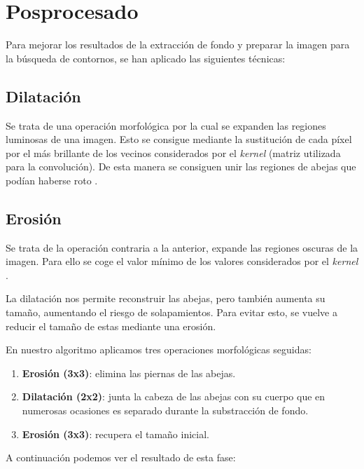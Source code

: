 \section{Posprocesado}\label{posprocesado}

Para mejorar los resultados de la extracción de fondo y preparar la
imagen para la búsqueda de contornos, se han aplicado las siguientes
técnicas:

\subsection{Dilatación}\label{dilatacion}

Se trata de una operación morfológica por la cual se expanden las
regiones luminosas de una imagen. Esto se consigue mediante la
sustitución de cada píxel por el más brillante de los vecinos
considerados por el \emph{kernel} (matriz utilizada para la
convolución). De esta manera se consiguen unir las regiones de abejas
que podían haberse roto \citep{book:mastering_opencv}.

\subsection{Erosión}\label{erosion}

Se trata de la operación contraria a la anterior, expande las regiones
oscuras de la imagen. Para ello se coge el valor mínimo de los valores
considerados por el \emph{kernel} \citep{book:mastering_opencv}.

La dilatación nos permite reconstruir las abejas, pero también aumenta
su tamaño, aumentando el riesgo de solapamientos. Para evitar esto, se
vuelve a reducir el tamaño de estas mediante una erosión.

En nuestro algoritmo aplicamos tres operaciones morfológicas seguidas:

\begin{enumerate}
\def\labelenumi{\arabic{enumi}.}
\tightlist
\item
  \textbf{Erosión (3x3)}: elimina las piernas de las abejas.
\item
  \textbf{Dilatación (2x2)}: junta la cabeza de las abejas con su cuerpo
  que en numerosas ocasiones es separado durante la substracción de
  fondo.
\item
  \textbf{Erosión (3x3)}: recupera el tamaño inicial.
\end{enumerate}

A continuación podemos ver el resultado de esta fase:

